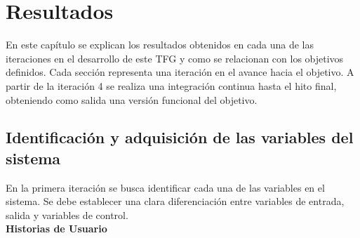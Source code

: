 \chapter{Resultados}
\label{cap:Resultados}
En este capítulo se explican los resultados obtenidos en cada una de las iteraciones en el desarrollo de este \gls{TFG} y como se relacionan con los objetivos definidos. Cada sección representa una iteración en el avance hacia el objetivo. A partir de la iteración 4 se realiza una integración continua hasta el hito final, obteniendo como salida una versión funcional del objetivo.

\section{Identificación y adquisición de las variables del sistema}
\label{sec:hito1}
En la primera iteración se busca identificar cada una de las variables en el sistema. Se debe establecer una clara diferenciación entre variables de entrada, salida y variables de control.\\

\textbf{Historias de Usuario}\\

